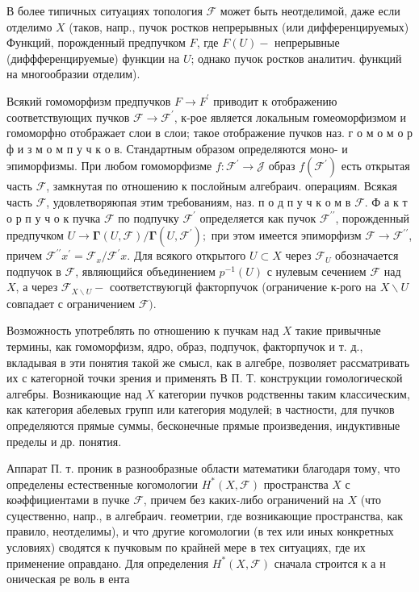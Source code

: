 \documentclass[10pt]{article}
\begin{document}
В более типичных ситуациях топология $\mathscr{F}$ может быть неотделимой, даже если отделимо $X$ (таков, напр., пучок ростков непрерывных (или дифференцируемых) Функций, порожденный предпучком $F$, где $F(U)-$ непрерывные (диффференцируемые) функции на $U$; однако пучок ростков аналитич. функций на многообразии отделим).



Всякий гомоморфизм предпучков $F \rightarrow F^{\prime}$ приводит к отображению соответствующих пучков $\mathscr{F} \rightarrow \mathscr{F}^{\prime}$, к-рое является локальным гомеоморфизмом и гомоморфно отображает слои в слои; такое отображение пучков наз. г о м о м о р ф и з м о м п у ч к о в. Стандартным образом определяются моно- и эпиморфизмы. При любом гомоморфизме $f: \mathscr{F}^{\prime} \rightarrow \mathscr{J}$ образ $f\left(\mathscr{F}^{\prime}\right)$ есть открытая часть $\mathscr{F}$, замкнутая по отношению к послойным алгебраич. операциям. Всякая часть $\mathscr{F}$, удовлетворяюпая этим требованиям, наз. п о д п у ч к о м в $\mathscr{F}$. Ф а к т о р п у ч о к пучка $\mathscr{F}$ по подпучку $\mathscr{F}^{\prime}$ определяется как пучок $\mathscr{F}^{\prime \prime}$, порожденный предпучком $U \rightarrow \boldsymbol{\Gamma}(U, \mathscr{F}) / \boldsymbol{\Gamma}\left(U, \mathscr{F}^{\prime}\right) ;$ при этом имеется эпиморфизм $\mathscr{F} \rightarrow \mathscr{F}^{\prime \prime}$, причем $\mathscr{F}^{\prime \prime} x^{\prime}=\mathscr{F}_{x} / \mathscr{F}^{\prime} x$. Для всякого открытого $U \subset X$ через $\mathscr{F}_{U}$ обозначается подпучок в $\mathscr{F}$, являющийся объединением $p^{-1}(U)$ с нулевым сечением $\mathscr{F}$ над $X$, а через $\mathscr{F}_{X \backslash U}-$ соответствуюгцй факторпучок (ограничение к-рого на $X \backslash U$ совпадает с ограничением $\mathscr{F})$.



Возможность употреблять по отношению к пучкам над $X$ такие привычные термины, как гомоморфизм, ядро, образ, подпучок, факторпучок и т. д., вкладывая в эти понятия такой же смысл, как в алгебре, позволяет рассматривать их с категорной точки зрения и применять В П. Т. конструкции гомологической алгебры. Возникающие над $X$ категории пучков родственны таким классическим, как категория абелевых групп или категория модулей; в частности, для пучков определяются прямые суммы, бесконечные прямые произведения, индуктивные пределы и др. понятия.



Аппарат П. т. проник в разнообразные области математики благодаря тому, что определены естественные когомологии $H^{*}(X, \mathscr{F})$ пространства $X$ с коәффициентами в пучке $\mathscr{F}$, причем без каких-либо ограничений на $X$ (что суцественно, напр., в алгебраич. геометрии, где возникающие пространства, как правило, неотделимы), и что другие когомологии (в тех или иных конкретных условиях) сводятся к пучковым по крайней мере в тех ситуациях, где их применение оправдано. Для определения $H^{*}(X, \mathscr{F})$ сначала строится к а н оническая ре воль в ента
\end{document}
